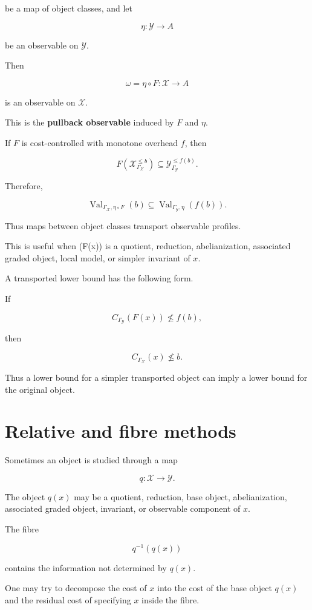 \documentclass[11pt]{article}
\begin{document}
be a map of object classes, and let

\[
\eta:\mathcal Y\to A
\]

be an observable on \(\mathcal Y\).

Then

\[
\omega=\eta\circ F:\mathcal X\to A
\]

is an observable on \(\mathcal X\).

This is the \textbf{pullback observable} induced by \(F\) and \(\eta\).

If \(F\) is cost-controlled with monotone overhead \(f\), then

\[
F(\mathcal X_{\Gamma_\mathcal X}^{\leq b})
\subseteq
\mathcal Y_{\Gamma_\mathcal Y}^{\leq f(b)}.
\]

Therefore,

\[
\operatorname{Val}_{\Gamma_\mathcal X,\eta\circ F}(b)
\subseteq
\operatorname{Val}_{\Gamma_\mathcal Y,\eta}(f(b)).
\]

Thus maps between object classes transport observable profiles.

This is useful when (F(x)) is a quotient, reduction, abelianization, associated graded object, local model, or simpler invariant of \(x\).

A transported lower bound has the following form.

If

\[
C_{\Gamma_\mathcal Y}(F(x))\nleq f(b),
\]

then

\[
C_{\Gamma_\mathcal X}(x)\nleq b.
\]

Thus a lower bound for a simpler transported object can imply a lower bound for the original object.


\section{Relative and fibre methods}

Sometimes an object is studied through a map

\[
q:\mathcal X\to\mathcal Y.
\]

The object \(q(x)\) may be a quotient, reduction, base object, abelianization, associated graded object, invariant, or observable component of \(x\).

The fibre

\[
q^{-1}(q(x))
\]

contains the information not determined by \(q(x)\).

One may try to decompose the cost of \(x\) into the cost of the base object \(q(x)\) and the residual cost of specifying \(x\) inside the fibre.
\end{document}
